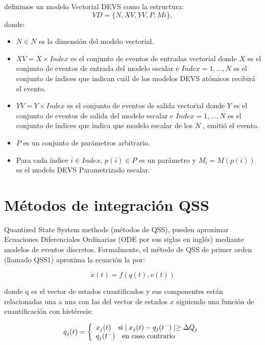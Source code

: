 \documentclass[a4paper,	11pt]{report}
\begin{document}
definimos un modelo Vectorial DEVS como la estructura:
\begin{equation}
V D = \{N, XV, Y V, P, {M i }\},
\end{equation}
donde:
\begin{itemize}
\item $N \in N$ es la dimensión del modelo vectorial.

\item $XV = X \times Index$ es el conjunto de eventos de entradas vectorial donde $X$ es el conjunto de eventos de entrada del modelo escalar e $Index = {1, \ldots , N }$ es el conjunto de índices que indican cuál de los modelos DEVS atómicos recibirá el evento.

\item $YV = Y \times Index$ es el conjunto de eventos de salida vectorial donde $Y$ es el conjunto de eventos de salida del modelo escalar e $Index = {1, \ldots , N }$ es el conjunto de índices que indica que modelo escalar de los $N$ , emitió el evento.

\item $P$ es un conjunto de parámetros arbitrario.

\item Para cada índice $i \in Index$, $p(i) \in P$ es un parámetro y $M_i = M (p(i))$ es el modelo DEVS Parametrizado escalar.
\end{itemize}
	
\section{Métodos de integración QSS}
Quantized State System methods (métodos de QSS), pueden aproximar Ecuaciones Diferenciales Ordinarias (ODE por sus siglas en inglés) mediante modelos de eventos discretos. Formalmente, el método de QSS de primer orden (llamado QSS1) aproxima la ecuación la por:

\begin{equation}
\dot{x}(t) = f (q(t), v(t))
\end{equation}

donde q es el vector de estados cuantificados y sus componentes están relacionadas una a una con las del vector de estados $x$ siguiendo una función de cuantificación con histéresis:

\begin{equation}
q_j(t) = \left\{ 
  \begin{array}{l l}
    x_j(t)  \quad \text{si} \mid x_j (t ) - q_j (t^{-} ) \mid \geq \Delta Q_j \\
    q_j (t^{-} ) \quad \text{en caso contrario}
  \end{array} \right.
\end{equation}
\end{document}
